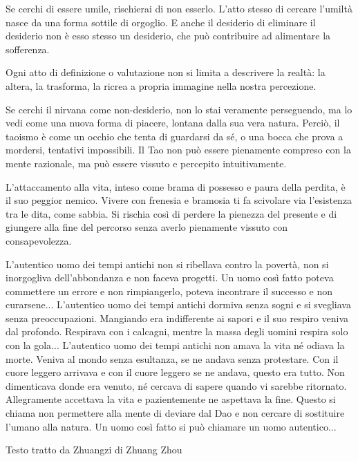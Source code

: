 \documentclass[12pt]{book} %
\begin{document}
Se cerchi di essere umile, rischierai di non esserlo. L’atto stesso di cercare l’umiltà nasce da una forma sottile di orgoglio.
E anche il desiderio di eliminare il desiderio non è esso stesso un desiderio, che può contribuire ad alimentare la sofferenza.

Ogni atto di definizione o valutazione non si limita a descrivere la realtà: la altera, la trasforma, la ricrea a propria immagine nella nostra percezione.

Se cerchi il nirvana come non-desiderio, non lo stai veramente perseguendo, ma lo vedi come una nuova forma di piacere, lontana dalla sua vera natura. Perciò, il taoismo è come un occhio che tenta di guardarsi da sé, o una bocca che prova a mordersi, tentativi impossibili. Il Tao non può essere pienamente compreso con la mente razionale, ma può essere vissuto e percepito intuitivamente.

L’attaccamento alla vita, inteso come brama di possesso e paura della perdita, è il suo peggior nemico.
Vivere con frenesia e bramosia ti fa scivolare via l’esistenza tra le dita, come sabbia. Si rischia così di perdere la pienezza del presente e di giungere alla fine del percorso senza averlo pienamente vissuto con consapevolezza.

\begin{mdframed}[linewidth=1pt]
L’autentico uomo dei tempi antichi non si ribellava contro la povertà, non si inorgogliva dell’abbondanza e non faceva progetti. Un uomo così fatto poteva commettere un errore e non rimpiangerlo, poteva incontrare il successo e non curarsene... L’autentico uomo dei tempi antichi dormiva senza sogni e si svegliava senza preoccupazioni. Mangiando era indifferente ai sapori e il suo respiro veniva dal profondo. Respirava con i calcagni, mentre la massa degli uomini respira solo con la gola... L’autentico uomo dei tempi antichi non amava la vita né odiava la morte. Veniva al mondo senza esultanza, se ne andava senza protestare. Con il cuore leggero arrivava e con il cuore leggero se ne andava, questo era tutto. Non dimenticava donde era venuto, né cercava di sapere quando vi sarebbe ritornato. Allegramente accettava la vita e pazientemente ne aspettava la fine. Questo si chiama non permettere alla mente di deviare dal Dao e non cercare di sostituire l’umano alla natura. Un uomo così fatto si può chiamare un uomo autentico...

Testo tratto da Zhuangzi di Zhuang Zhou 
\end{mdframed}
\end{document}
